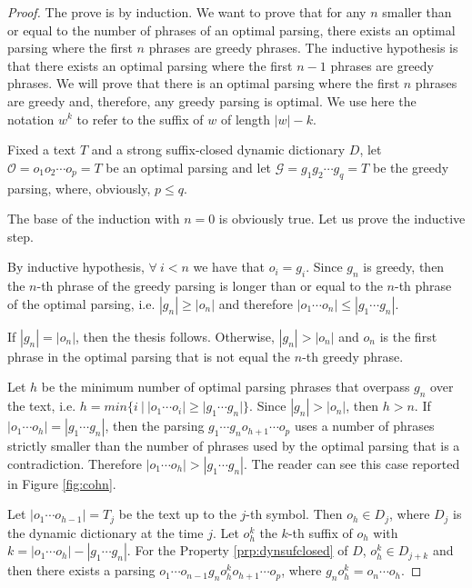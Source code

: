 \documentclass[12pt]{article}
\theoremstyle{plain}
\theoremstyle{definition}
\theoremstyle{remark}
\begin{document}
\begin{proof}
The prove is by induction. We want to prove that for any $n$ smaller than or equal to the number of phrases of an optimal parsing, there exists an optimal parsing where the first $n$ phrases are greedy phrases.
The inductive hypothesis is that there exists an optimal parsing where the first $n-1$ phrases are greedy phrases. We will prove that there is an optimal parsing where the first $n$ phrases are greedy and, therefore, any greedy parsing is optimal.
We use here the notation $w^k$ to refer to the suffix of $w$ of length $|w|-k$.

Fixed a text $T$ and a strong suffix-closed dynamic dictionary $D$, let $\mathcal{O}=o_1o_2\cdots o_p=T$ be an optimal parsing and let $\mathcal{G}=g_1g_2\cdots g_q=T$ be the greedy parsing, where, obviously, $p\leq q$. 

The base of the induction with $n=0$ is obviously true. Let us prove the inductive step.

By inductive hypothesis,  $\forall\ i<n$ we have that $o_i=g_i$.
Since $g_{n}$ is greedy, then the $n$-th phrase of the greedy parsing is longer than or equal to the $n$-th phrase of the optimal parsing, i.e. $|g_{n}|\geq |o_{n}|$ and therefore $|o_1\cdots o_{n}|\leq |g_1\cdots g_{n}|$.

If $|g_{n}| = |o_{n}|$, then the thesis follows.
Otherwise, $|g_{n}| > |o_{n}|$ and $o_n$ is the first phrase in the optimal parsing that is not equal the $n$-th greedy phrase.


Let $h$ be the minimum number of optimal parsing phrases that overpass $g_n$ over the text, i.e. $h=min\{i\ |\ |o_1\cdots o_{i}| \geq |g_1\cdots g_{n}|\}$. Since $|g_{n}| > |o_{n}|$, then $h>n$.
If $|o_1\cdots o_{h}| = |g_1\cdots g_{n}|$, 
then the parsing $g_1 \cdots g_n o_{h+1} \cdots o_p$ uses a number of phrases strictly smaller than the number of phrases used by the optimal parsing that is a contradiction.
Therefore $|o_1\cdots o_{h}| > |g_1\cdots g_{n}|$. The reader can see this case reported in Figure \ref{fig:cohn}.



Let $|o_1\cdots o_{h-1}|=T_j$ be the text up to the $j$-th symbol. Then $o_h\in D_j$, where $D_j$ is the dynamic dictionary at the time $j$. 
Let $o_{h}^k$ the $k$-th suffix of $o_h$ with $k=|o_1\cdots o_{h}| - |g_1\cdots g_{n}|$. 
For the Property \ref{prp:dynsufclosed} of $D$, $o_{h}^k \in D_{j+k}$ and then there exists a parsing $o_1 \cdots o_{n-1} g_n o_{h}^k o_{h+1} \cdots  o_p$, where $g_n o_{h}^k=o_n\cdots o_h$. 



\end{proof}
\end{document}
